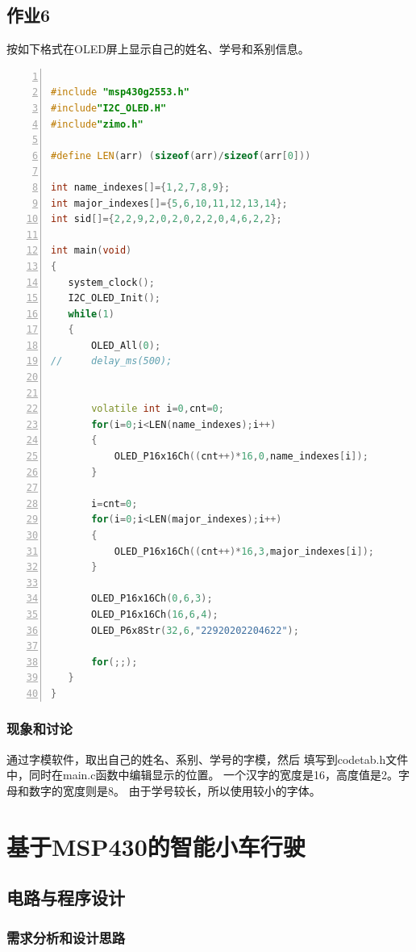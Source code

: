 \documentclass[a4paper,twoside,zihao=5,UTF8]{ctexart}
\begin{document}
\begin{spacing}{1.2}
\subsection{作业6}

按如下格式在OLED屏上显示自己的姓名、学号和系别信息。

\begin{lstlisting}[language=c++,numbers=left,style=CppStyle,caption=作业6,label={code:p6}]

#include "msp430g2553.h"
#include"I2C_OLED.H"
#include"zimo.h"

#define LEN(arr) (sizeof(arr)/sizeof(arr[0]))

int name_indexes[]={1,2,7,8,9};
int major_indexes[]={5,6,10,11,12,13,14};
int sid[]={2,2,9,2,0,2,0,2,2,0,4,6,2,2};

int main(void)
{
   system_clock();
   I2C_OLED_Init();
   while(1)
   {
	   OLED_All(0);
//	   delay_ms(500);


	   volatile int i=0,cnt=0;
	   for(i=0;i<LEN(name_indexes);i++)
	   {
	       OLED_P16x16Ch((cnt++)*16,0,name_indexes[i]);
	   }

	   i=cnt=0;
	   for(i=0;i<LEN(major_indexes);i++)
	   {
	       OLED_P16x16Ch((cnt++)*16,3,major_indexes[i]);
	   }

	   OLED_P16x16Ch(0,6,3);
	   OLED_P16x16Ch(16,6,4);
	   OLED_P6x8Str(32,6,"22920202204622");

	   for(;;);
   }
}
\end{lstlisting}

\subsubsection{现象和讨论}

通过字模软件，取出自己的姓名、系别、学号的字模，然后
填写到codetab.h文件中，同时在main.c函数中编辑显示的位置。
一个汉字的宽度是16，高度值是2。字母和数字的宽度则是8。
由于学号较长，所以使用较小的字体。


\section{基于MSP430的智能小车行驶}

\subsection{电路与程序设计}

\subsubsection{需求分析和设计思路}


\end{spacing}
\end{document}
